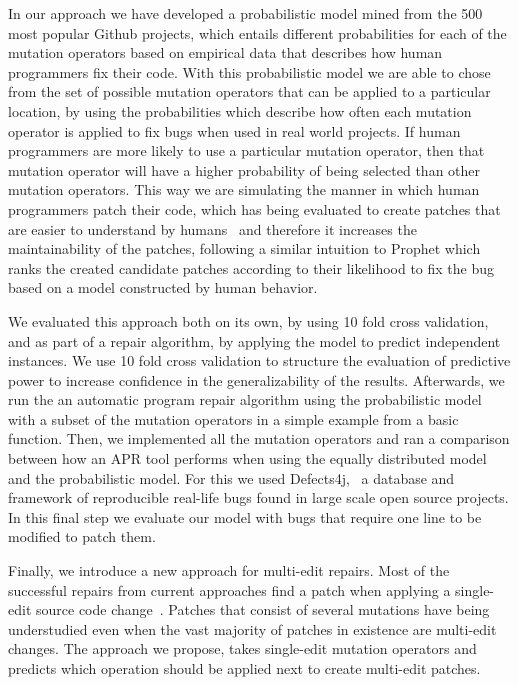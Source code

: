 \documentclass[conference]{IEEEtran}
\begin{document}
In our approach 
we have developed a probabilistic model mined 
from the 500 most popular Github projects, which 
entails different probabilities for each of the mutation operators based on 
empirical data that describes how human programmers fix their code. With this probabilistic model we are able to chose from the set of possible
mutation operators that can be applied to a particular location, by using the
probabilities which describe how often each mutation operator is applied
to fix bugs when used in real world projects. If human programmers are more likely to
use a particular mutation operator, then that mutation operator will have a
higher probability of being selected than other mutation operators. This way we 
are simulating the manner in which human programmers patch their code, which has 
being evaluated to create patches that are easier to understand by humans~\cite{kim2013} and 
therefore it increases the maintainability of the patches, following a similar intuition to Prophet\cite{long15} which ranks the created candidate patches according to their likelihood to fix the bug based on a model constructed by human behavior. 

We evaluated this approach both on its own, by using 10 fold cross validation, and as part of a repair algorithm, by applying the model to predict independent instances. We use 10 fold cross validation to structure the evaluation of predictive power to increase confidence in the generalizability of the results. Afterwards, we run the an automatic program repair algorithm using the probabilistic model with a subset of the mutation 
operators in a simple example from a basic function. Then, we implemented all 
the mutation operators and ran a comparison between how an APR tool performs when                     using the equally distributed model  
and the probabilistic model. For this we used Defects4j,~\cite{just14} a 
database and framework of reproducible real-life bugs found in large scale open 
source projects. In this final step we evaluate our model with bugs that require 
one line to be modified to patch them. 

Finally, we introduce a new approach for multi-edit repairs. Most of the successful repairs from current approaches find a patch when applying a single-edit source code change~\cite{Weimer13,Qi15,kim2013}. Patches that consist of several mutations have being understudied even when the vast majority of patches in existence are multi-edit changes. The approach we propose, takes single-edit mutation operators and predicts which operation should be applied next to create multi-edit patches.
\end{document}

